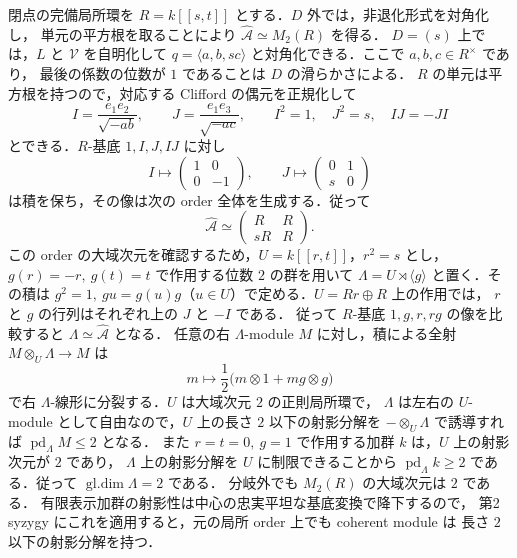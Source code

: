 閉点の完備局所環を $R=k[[s,t]]$ とする．$D$ 外では，非退化形式を対角化し，
単元の平方根を取ることにより $\widehat{\mathcal A}\simeq M_2(R)$ を得る．
$D=(s)$ 上では，$L$ と $\mathcal V$ を自明化して
$q=\langle a,b,sc\rangle$ と対角化できる．ここで $a,b,c\in R^\times$ であり，
最後の係数の位数が $1$ であることは $D$ の滑らかさによる．
$R$ の単元は平方根を持つので，対応する Clifford の偶元を正規化して
\[
 I=\frac{e_1e_2}{\sqrt{-ab}},\qquad
 J=\frac{e_1e_3}{\sqrt{-ac}},\qquad
 I^2=1,\quad J^2=s,\quad IJ=-JI
\]
とできる．$R$-基底 $1,I,J,IJ$ に対し
\[
 I\longmapsto\begin{pmatrix}1&0\\0&-1\end{pmatrix},\qquad
 J\longmapsto\begin{pmatrix}0&1\\s&0\end{pmatrix}
\]
は積を保ち，その像は次の order 全体を生成する．従って
\begin{equation}
 \widehat{\mathcal A}\simeq
 \begin{pmatrix}R&R\\sR&R\end{pmatrix}.
 \label{eq:local-order}
\end{equation}
この order の大域次元を確認するため，$U=k[[r,t]]$，$r^2=s$ とし，
$g(r)=-r,\ g(t)=t$ で作用する位数 $2$ の群を用いて
$\Lambda=U\rtimes\langle g\rangle$ と置く．その積は
$g^2=1,\ gu=g(u)g$（$u\in U$）で定める．$U=Rr\oplus R$ 上の作用では，
$r$ と $g$ の行列はそれぞれ上の $J$ と $-I$ である．
従って $R$-基底 $1,g,r,rg$ の像を比較すると
$\Lambda\simeq\widehat{\mathcal A}$ となる．
任意の右 $\Lambda$-module $M$ に対し，積による全射
$M\otimes_U\Lambda\to M$ は
\[
 m\longmapsto\frac12\bigl(m\otimes1+mg\otimes g\bigr)
\]
で右 $\Lambda$-線形に分裂する．$U$ は大域次元 $2$ の正則局所環で，
$\Lambda$ は左右の $U$-module として自由なので，$U$ 上の長さ $2$ 以下の射影分解を
$-\otimes_U\Lambda$ で誘導すれば $\operatorname{pd}_{\Lambda}M\le2$ となる．
また $r=t=0,\ g=1$ で作用する加群 $k$ は，$U$ 上の射影次元が $2$ であり，
$\Lambda$ 上の射影分解を $U$ に制限できることから
$\operatorname{pd}_{\Lambda}k\ge2$ である．従って $\operatorname{gl.dim}\Lambda=2$ である．
分岐外でも $M_2(R)$ の大域次元は $2$ である．
有限表示加群の射影性は中心の忠実平坦な基底変換で降下するので，
第2 syzygy にこれを適用すると，元の局所 order 上でも coherent module は
長さ $2$ 以下の射影分解を持つ．

